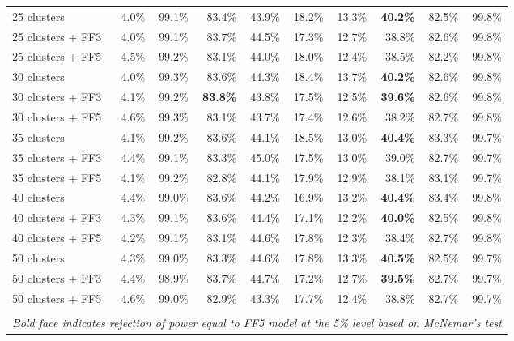 \begin{table}[!h]
\begin{center}
\begin{tabular}{lrrrrrrrrr}
25 clusters	& 4.0\% & 99.1\% & 83.4\% & 43.9\% & 18.2\% & 13.3\% & \textbf{40.2\%} & 82.5\% & 99.8\% \\
25 clusters + FF3	& 4.0\% & 99.1\% & 83.7\% & 44.5\% & 17.3\% & 12.7\% & 38.8\% & 82.6\% & 99.8\% \\
25 clusters + FF5	& 4.5\% & 99.2\% & 83.1\% & 44.0\% & 18.0\% & 12.4\% & 38.5\% & 82.2\% & 99.8\% \\
30 clusters	& 4.0\% & 99.3\% & 83.6\% & 44.3\% & 18.4\% & 13.7\% & \textbf{40.2\%} & 82.6\% & 99.8\% \\
30 clusters + FF3	& 4.1\% & 99.2\% & \textbf{83.8\%} & 43.8\% & 17.5\% & 12.5\% & \textbf{39.6\%} & 82.6\% & 99.8\% \\
30 clusters + FF5	& 4.6\% & 99.3\% & 83.1\% & 43.7\% & 17.4\% & 12.6\% & 38.2\% & 82.7\% & 99.8\% \\
35 clusters	& 4.1\% & 99.2\% & 83.6\% & 44.1\% & 18.5\% & 13.0\% & \textbf{40.4\%} & 83.3\% & 99.7\% \\
35 clusters + FF3	& 4.4\% & 99.1\% & 83.3\% & 45.0\% & 17.5\% & 13.0\% & 39.0\% & 82.7\% & 99.7\% \\
35 clusters + FF5	& 4.1\% & 99.2\% & 82.8\% & 44.1\% & 17.9\% & 12.9\% & 38.1\% & 83.1\% & 99.7\% \\
40 clusters	& 4.4\% & 99.0\% & 83.6\% & 44.2\% & 16.9\% & 13.2\% & \textbf{40.4\%} & 83.4\% & 99.8\% \\
40 clusters + FF3	& 4.3\% & 99.1\% & 83.6\% & 44.4\% & 17.1\% & 12.2\% & \textbf{40.0\%} & 82.5\% & 99.8\% \\
40 clusters + FF5	& 4.2\% & 99.1\% & 83.1\% & 44.6\% & 17.8\% & 12.3\% & 38.4\% & 82.7\% & 99.8\% \\
50 clusters	& 4.3\% & 99.0\% & 83.3\% & 44.6\% & 17.8\% & 13.3\% & \textbf{40.5\%} & 82.5\% & 99.7\% \\
50 clusters + FF3	& 4.4\% & 98.9\% & 83.7\% & 44.7\% & 17.2\% & 12.7\% & \textbf{39.5\%} & 82.7\% & 99.7\% \\
50 clusters + FF5	& 4.6\% & 99.0\% & 82.9\% & 43.3\% & 17.7\% & 12.4\% & 38.8\% & 82.7\% & 99.7\% \\
\hline\\
\multicolumn{10}{l}{\itshape Bold face indicates rejection of power equal to FF5 model at the 5\% level based on McNemar's test}
    \end{tabular}
    \end{center}
\end{table}
